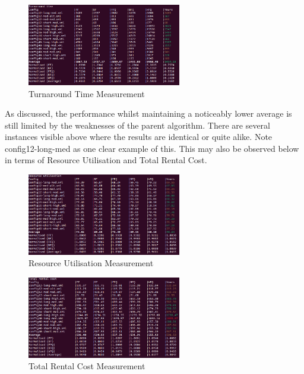 \documentclass[a4paper]{article} %
\begin{document}
\begin{figure}[h]
    \centering
    \includegraphics[width=0.6\textwidth]{images/TURNAROUND.png}
    \caption{Turnaround Time Measurement}
    \label{fig:my_label}
\end{figure}

As discussed, the performance whilst maintaining a noticeably lower average is still limited by the weaknesses of the parent algorithm. There are several instances visible above where the results are identical or quite alike. Note config12-long-med as one clear example of this. This may also be observed below in terms of Resource Utilisation and Total Rental Cost.

\begin{figure}[h]
    \centering
    \includegraphics[width=0.6\textwidth]{images/resource util.png}
    \caption{Resource Utilisation Measurement}
    \label{fig:my_label}
\end{figure}

\begin{figure}[h]
    \centering
    \includegraphics[width=0.6\textwidth]{images/total rental cost.png}
    \caption{Total Rental Cost Measurement}
    \label{fig:my_label}
\end{figure}\newpage
\end{document}
